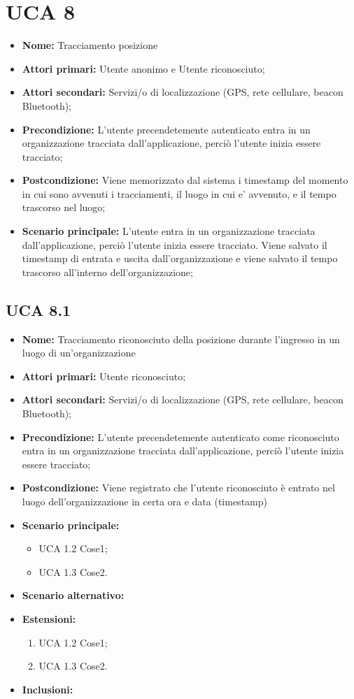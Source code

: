 \section{UCA 8}%
\begin{itemize}
\item \textbf{Nome:} Tracciamento posizione
\item \textbf{Attori primari:} Utente anonimo e Utente riconosciuto;
\item \textbf{Attori secondari:} Servizi/o di localizzazione (GPS, rete cellulare, beacon Bluetooth);
\item \textbf{Precondizione:} L'utente precendetemente autenticato entra in un organizzazione tracciata dall'applicazione, perciò l'utente inizia essere tracciato;
\item \textbf{Postcondizione:} Viene memorizzato dal sistema i timestamp del momento in cui sono avvenuti i tracciamenti, il luogo in cui e’ avvenuto, e il tempo trascorso nel luogo;
\item \textbf{Scenario principale:} L'utente entra in un organizzazione tracciata dall'applicazione, perciò l'utente inizia essere tracciato. Viene salvato il timestamp di entrata e uscita dall'organizzazione e viene salvato il tempo trascorso all'interno dell'organizzazione;
\end{itemize}

\subsection{UCA 8.1}%
\begin{itemize}
\item \textbf{Nome:} Tracciamento riconosciuto della posizione durante l'ingresso in un luogo di un'organizzazione
\item \textbf{Attori primari:} Utente riconosciuto;
\item \textbf{Attori secondari:} Servizi/o di localizzazione (GPS, rete cellulare, beacon Bluetooth);
\item \textbf{Precondizione:} L'utente precendetemente autenticato come riconosciuto entra in un organizzazione tracciata dall'applicazione, perciò l'utente inizia essere tracciato;
\item \textbf{Postcondizione:} Viene registrato che l'utente riconosciuto è entrato nel luogo dell'organizzazione in certa ora e data (timestamp)
\item \textbf{Scenario principale:}
	\begin{itemize}
	\item UCA 1.2 Cose1;
	\item UCA 1.3 Cose2.
\end{itemize}
\item \textbf{Scenario alternativo:}
\item \textbf{Estensioni:}
	\begin{enumerate}
		\item UCA 1.2 Cose1;
		\item UCA 1.3 Cose2.
	\end{enumerate}
\item \textbf{Inclusioni:}
\end{itemize}

